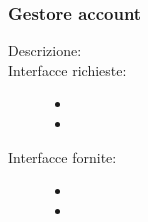 \documentclass[11pt, a4paper]{article}
\theoremstyle{definition} %
\begin{document}
\subsubsection{Gestore account}
\begin{description}
    \item[Descrizione:]

    \item[Interfacce richieste:]
    \begin{itemize}
        \item[]

        \item
    \end{itemize}

    \item[Interfacce fornite:]
    \begin{itemize}
        \item[]

        \item
    \end{itemize}
\end{description}


\newpage
\end{document}
